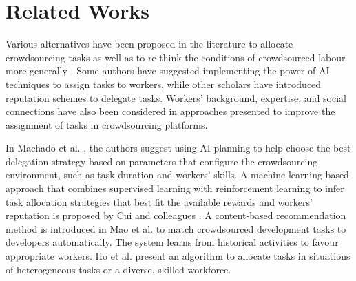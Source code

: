 
\section{Related Works}\label{sec:related_works}
Various alternatives have been proposed in the literature to allocate crowdsourcing tasks \cite{machado2016task, cui2017complex, mao2015developer, ho2013adaptive, difallah2013pick, kamel2020tasks, zhao2019task, jiang2019group, yu2013bringing, fu2021fairness} as well as to re-think the conditions of crowdsourced labour more generally \cite{kittur2013future,graham2018towards}. Some authors have suggested implementing the power of AI techniques to assign tasks to workers, while other scholars have introduced reputation schemes to delegate tasks. Workers' background, expertise, and social connections have also been considered in approaches presented to improve the assignment of tasks in crowdsourcing platforms.%

In Machado et al. \cite{machado2016task}, the authors suggest using AI planning to help choose the best delegation strategy based on parameters that configure the crowdsourcing environment, such as task duration and workers' skills. A machine learning-based approach that combines supervised learning with reinforcement learning to infer task allocation strategies that best fit the available rewards and workers' reputation is proposed by Cui and colleagues \cite{cui2017complex}.  A content-based recommendation method is introduced in Mao et al. \cite{mao2015developer} to match crowdsourced development tasks to developers automatically. The system learns from historical activities to favour appropriate workers. Ho et al. \cite{ho2013adaptive} present an algorithm to allocate tasks in situations of heterogeneous tasks or a diverse, skilled workforce.

